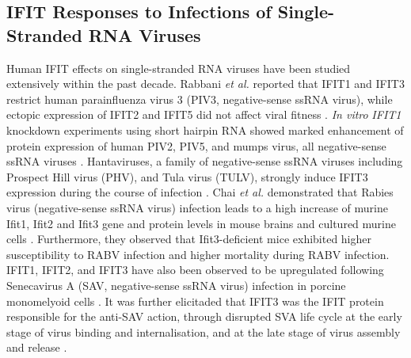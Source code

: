 \subsection{IFIT Responses to Infections of Single-Stranded RNA Viruses} \label{subsec:IFIT Responses to Viral Infections}
Human IFIT effects on single-stranded RNA viruses have been studied extensively within the past decade. Rabbani \textit{et al.} reported that IFIT1 and IFIT3 restrict human parainfluenza virus 3 (PIV3, negative-sense ssRNA virus), while ectopic expression of IFIT2 and IFIT5 did not affect viral fitness \cite{Rabbani2016Identification3}. \textit{In vitro} \textit{IFIT1} knockdown experiments using short hairpin RNA showed marked enhancement of protein expression of human PIV2, PIV5, and mumps virus, all negative-sense ssRNA viruses \cite{Andrejeva2013ISG56/IFIT1Synthesis, Young2016HumanFamily}. Hantaviruses, a family of negative-sense ssRNA viruses including Prospect Hill virus (PHV), and Tula virus (TULV), strongly induce IFIT3 expression during the course of infection \cite{Matthys2011TheInduction}. Chai \textit{et al.} demonstrated that Rabies virus (negative-sense ssRNA virus) infection leads to a high increase of murine Ifit1, Ifit2 and Ifit3 gene and protein levels in mouse brains and cultured murine cells \cite{Chai2021MurineVivo}. Furthermore, they observed that Ifit3-deficient mice exhibited higher susceptibility to RABV infection and higher mortality during RABV infection. IFIT1, IFIT2, and IFIT3 have also been observed to be upregulated following Senecavirus A (SAV, negative-sense ssRNA virus) infection in porcine monomelyoid cells \cite{Xu2022IFIT3Pathways}. It was further elicitaded that IFIT3 was the IFIT protein responsible for the anti-SAV action, through disrupted SVA life cycle at the early stage of virus binding and internalisation, and at the late stage of virus assembly and release \cite{Xu2022IFIT3Pathways}.

